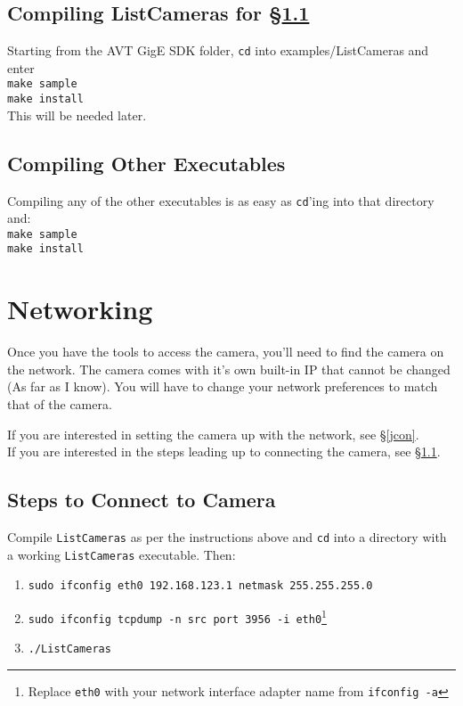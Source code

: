 \documentclass[10pt,a4paper]{article}
\begin{document}
\subsection{Compiling ListCameras for \S\ref{hto}}
Starting from the AVT GigE SDK folder, \texttt{cd} into examples/ListCameras and enter\\
\texttt{make sample}\\
\texttt{make install}\\

This will be needed later.

\subsection{Compiling Other Executables}
Compiling any of the other executables is as easy as \texttt{cd}'ing into that directory and:\\
\texttt{make sample}\\
\texttt{make install}

\section{Networking}
Once you have the tools to access the camera, you'll need to find the camera on the network. The camera comes with it's own built-in IP that cannot be changed (As far as I know). You will have to change your network preferences to match that of the camera. 

If you are interested in setting the camera up with the network, see \S\ref{jcon}.\\
If you are interested in the steps leading up to connecting the camera, see \S\ref{hto}.


\subsection{Steps to Connect to Camera}\label{hto}
Compile \texttt{ListCameras} as per the instructions above and \texttt{cd} into a directory with a working \texttt{ListCameras} executable. Then:\\
\begin{enumerate}
\item \texttt{sudo ifconfig eth0 192.168.123.1 netmask 255.255.255.0}
\item \texttt{sudo ifconfig tcpdump -n src port 3956 -i eth0}\footnote{Replace \texttt{eth0} with your network interface adapter name from \texttt{ifconfig -a}}
\item \texttt{./ListCameras}
\end{enumerate}
\end{document}
